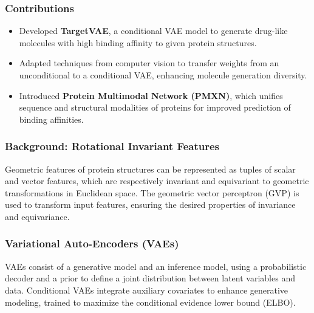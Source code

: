\documentclass[11pt,xcolor={dvipsnames},hyperref={pdftex,pdfpagemode=UseNone,hidelinks,pdfdisplaydoctitle=true},usepdftitle=false]{beamer}
\begin{document}
    \begin{frame}
    \frametitle{Contributions}
    \begin{itemize}
        \item Developed \textbf{TargetVAE}, a conditional VAE model to generate drug-like molecules with high binding affinity to given protein structures.
        \item Adapted techniques from computer vision to transfer weights from an unconditional to a conditional VAE, enhancing molecule generation diversity.
        \item Introduced \textbf{Protein Multimodal Network (PMXN)}, which unifies sequence and structural modalities of proteins for improved prediction of binding affinities.
    \end{itemize}
    \end{frame}
    
    \begin{frame}
    \frametitle{Background: Rotational Invariant Features}
    Geometric features of protein structures can be represented as tuples of scalar and vector features, which are respectively invariant and equivariant to geometric transformations in Euclidean space. The geometric vector perceptron (GVP) is used to transform input features, ensuring the desired properties of invariance and equivariance.
    
    \end{frame}
    
    \begin{frame}
    \frametitle{Variational Auto-Encoders (VAEs)}
    VAEs consist of a generative model and an inference model, using a probabilistic decoder and a prior to define a joint distribution between latent variables and data. Conditional VAEs integrate auxiliary covariates to enhance generative modeling, trained to maximize the conditional evidence lower bound (ELBO).
    
    \end{frame}
    
\end{document}
